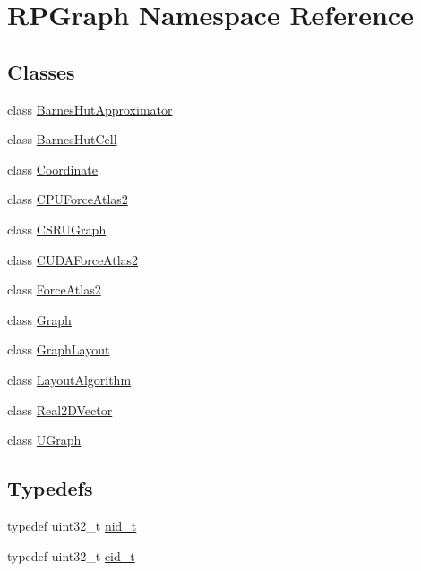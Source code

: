 \hypertarget{namespaceRPGraph}{}\section{R\+P\+Graph Namespace Reference}
\label{namespaceRPGraph}
\subsection*{Classes}
\begin{DoxyCompactItemize}
\item 
class \mbox{\hyperlink{classRPGraph_1_1BarnesHutApproximator}{Barnes\+Hut\+Approximator}}
\item 
class \mbox{\hyperlink{classRPGraph_1_1BarnesHutCell}{Barnes\+Hut\+Cell}}
\item 
class \mbox{\hyperlink{classRPGraph_1_1Coordinate}{Coordinate}}
\item 
class \mbox{\hyperlink{classRPGraph_1_1CPUForceAtlas2}{C\+P\+U\+Force\+Atlas2}}
\item 
class \mbox{\hyperlink{classRPGraph_1_1CSRUGraph}{C\+S\+R\+U\+Graph}}
\item 
class \mbox{\hyperlink{classRPGraph_1_1CUDAForceAtlas2}{C\+U\+D\+A\+Force\+Atlas2}}
\item 
class \mbox{\hyperlink{classRPGraph_1_1ForceAtlas2}{Force\+Atlas2}}
\item 
class \mbox{\hyperlink{classRPGraph_1_1Graph}{Graph}}
\item 
class \mbox{\hyperlink{classRPGraph_1_1GraphLayout}{Graph\+Layout}}
\item 
class \mbox{\hyperlink{classRPGraph_1_1LayoutAlgorithm}{Layout\+Algorithm}}
\item 
class \mbox{\hyperlink{classRPGraph_1_1Real2DVector}{Real2\+D\+Vector}}
\item 
class \mbox{\hyperlink{classRPGraph_1_1UGraph}{U\+Graph}}
\end{DoxyCompactItemize}
\subsection*{Typedefs}
\begin{DoxyCompactItemize}
\item 
typedef uint32\+\_\+t \mbox{\hyperlink{namespaceRPGraph_ab3ae34f1ab88e48f43794c30c8697b74}{nid\+\_\+t}}
\item 
typedef uint32\+\_\+t \mbox{\hyperlink{namespaceRPGraph_ae1c8374fd31c97d09000581a63811ee4}{eid\+\_\+t}}
\end{DoxyCompactItemize}
